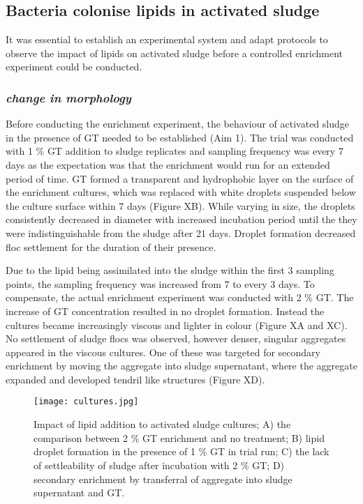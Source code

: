 \documentclass[11pt]{article}
\begin{document}
\subsection{Bacteria colonise lipids in activated sludge}
It was essential to establish an experimental system and adapt protocols to observe the impact of lipids on activated sludge before a controlled enrichment experiment could be conducted. 

\subsubsection{\emph{change in morphology}}
Before conducting the enrichment experiment, the behaviour of activated sludge in  the presence of GT needed to be established (Aim 1). The trial was conducted with 1 \% GT  addition to sludge replicates and sampling frequency was every 7 days as the expectation was that the enrichment would run for an extended period of time. GT formed a transparent and hydrophobic layer on the surface of the enrichment cultures, which was replaced with white droplets suspended below the culture surface within 7 days (Figure XB). While varying in size, the droplets consistently decreased in diameter with increased incubation period until the they were indistinguishable from the sludge after 21 days. Droplet formation decreased floc settlement for the duration of their presence. 


Due to the lipid being assimilated into the sludge within the first 3 sampling points, the sampling frequency was increased from 7 to every 3 days. To compensate, the actual enrichment experiment was conducted with 2 \% GT. The increase of GT concentration resulted in no droplet formation. Instead the cultures became increasingly viscous and lighter in colour (Figure XA and XC). No settlement of sludge flocs was observed, however denser, singular aggregates appeared in the viscous cultures. One of these was targeted for secondary enrichment by moving the aggregate into sludge supernatant, where the aggregate expanded and developed tendril like structures (Figure XD).
\begin{figure}
\texttt{[image: cultures.jpg]}
\caption{Impact of lipid addition to activated sludge cultures; A) the comparison between 2 \% GT enrichment and no treatment; B) lipid droplet formation in the presence of 1 \% GT in trial run; C) the lack of settleability of sludge after incubation with 2 \% GT; D) secondary enrichment by transferral of aggregate into sludge supernatant and GT.}
\end{figure}
\FloatBarrier
\end{document}
